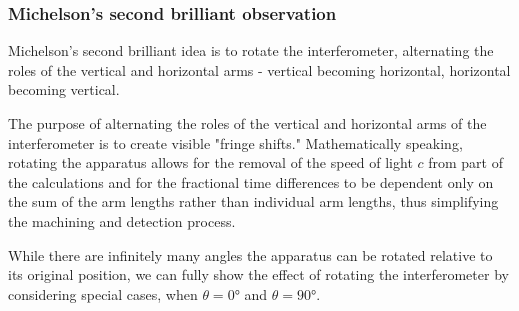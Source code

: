\documentclass[a4paper,11pt]{article}
\numberwithin{equation}{section}
\begin{document}
 \subsubsection{Michelson's second brilliant observation}
 Michelson's second brilliant idea is to rotate the interferometer, alternating the roles of the vertical and horizontal arms - vertical becoming horizontal, horizontal becoming vertical. 
 
 \noindent The purpose of alternating the roles of the vertical and horizontal arms of the interferometer is to create visible "fringe shifts." Mathematically speaking, rotating the apparatus allows for the removal of the speed of light $c$ from part of the calculations and for the fractional time differences to be dependent only on the sum of the arm lengths rather than individual arm lengths, thus simplifying the machining and detection process. 
 
 \noindent While there are infinitely many angles the apparatus can be rotated relative to its original position, we can fully show the effect of rotating the interferometer by considering special cases, when $\theta=\ang{0}$ and $\theta=\ang{90}$.
 
\end{document}
